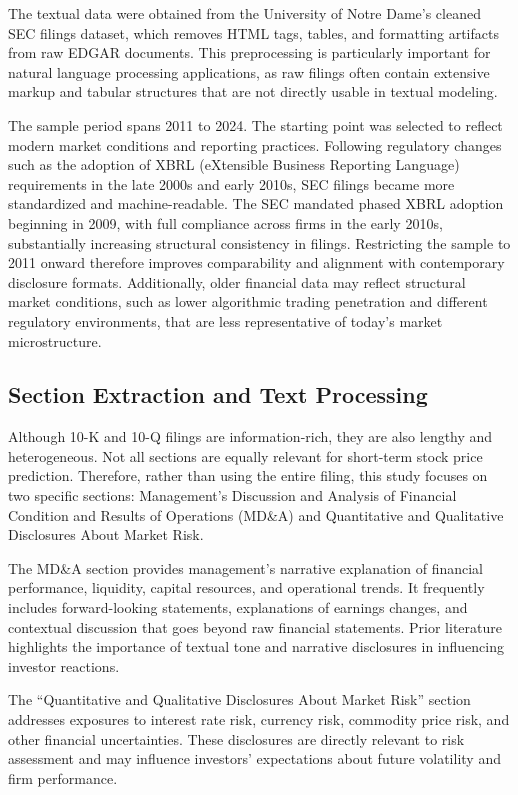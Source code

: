 The textual data were obtained from the University of Notre Dame's cleaned SEC filings dataset\cite{sec_edgar_nd}, which removes HTML tags, tables, and formatting artifacts from raw EDGAR documents. 
This preprocessing is particularly important for natural language processing applications, as raw filings often contain extensive markup and tabular structures that are not directly usable in textual modeling.

The sample period spans 2011 to 2024. 
The starting point was selected to reflect modern market conditions and reporting practices. 
Following regulatory changes such as the adoption of XBRL (eXtensible Business Reporting Language) requirements in the late 2000s and early 2010s, SEC filings became more standardized and machine-readable. 
The SEC mandated phased XBRL adoption beginning in 2009, with full compliance across firms in the early 2010s, substantially increasing structural consistency in filings. 
Restricting the sample to 2011 onward therefore improves comparability and alignment with contemporary disclosure formats. 
Additionally, older financial data may reflect structural market conditions, such as lower algorithmic trading penetration and different regulatory environments, that are less representative of today's market microstructure.

\subsection{Section Extraction and Text Processing}

Although 10-K and 10-Q filings are information-rich, they are also lengthy and heterogeneous.
Not all sections are equally relevant for short-term stock price prediction. 
Therefore, rather than using the entire filing, this study focuses on two specific sections: 
Management's Discussion and Analysis of Financial Condition and Results of Operations (MD\&A) and Quantitative and Qualitative Disclosures About Market Risk.

The MD\&A section provides management's narrative explanation of financial performance, liquidity, capital resources, and operational trends. 
It frequently includes forward-looking statements, explanations of earnings changes, and contextual discussion that goes beyond raw financial statements. 
Prior literature highlights the importance of textual tone and narrative disclosures in influencing investor reactions.

The “Quantitative and Qualitative Disclosures About Market Risk” section addresses exposures to interest rate risk, currency risk, commodity price risk, and other financial uncertainties. 
These disclosures are directly relevant to risk assessment and may influence investors' expectations about future volatility and firm performance.

